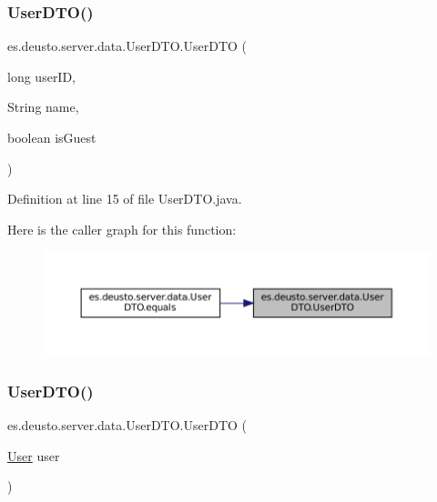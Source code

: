 \subsubsection{\texorpdfstring{UserDTO()}{UserDTO()}\hspace{0.1cm}{\footnotesize\ttfamily [1/2]}}
{\footnotesize\ttfamily es.\+deusto.\+server.\+data.\+User\+D\+T\+O.\+User\+D\+TO (\begin{DoxyParamCaption}\item[{long}]{user\+ID,  }\item[{String}]{name,  }\item[{boolean}]{is\+Guest }\end{DoxyParamCaption})}



Definition at line 15 of file User\+D\+T\+O.\+java.

Here is the caller graph for this function\+:\nopagebreak
\begin{figure}[H]
\begin{center}
\leavevmode
\includegraphics[width=350pt]{classes_1_1deusto_1_1server_1_1data_1_1_user_d_t_o_a00e605694b6157bcf7a1acc5e2adc735_icgraph}
\end{center}
\end{figure}
\mbox{\label{classes_1_1deusto_1_1server_1_1data_1_1_user_d_t_o_ab05044a5b24bdbdcc1bbe582b7268b71}} 
\subsubsection{\texorpdfstring{UserDTO()}{UserDTO()}\hspace{0.1cm}{\footnotesize\ttfamily [2/2]}}
{\footnotesize\ttfamily es.\+deusto.\+server.\+data.\+User\+D\+T\+O.\+User\+D\+TO (\begin{DoxyParamCaption}\item[{\mbox{\hyperlink{classes_1_1deusto_1_1server_1_1jdo_1_1_user}{User}}}]{user }\end{DoxyParamCaption})}



